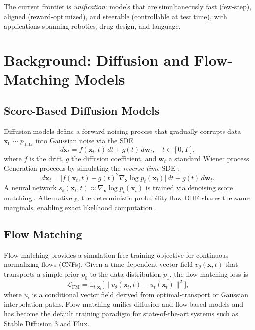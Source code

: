\documentclass[11pt]{article}
\begin{document}
The current frontier is \emph{unification}: models that are simultaneously fast (few-step), aligned (reward-optimized), and steerable (controllable at test time), with applications spanning robotics, drug design, and language.

\section{Background: Diffusion and Flow-Matching Models}
\label{sec:background}

\subsection{Score-Based Diffusion Models}

Diffusion models define a forward noising process that gradually corrupts data $\mathbf{x}_0 \sim p_{\mathrm{data}}$ into Gaussian noise via the SDE
\begin{equation}
    d\mathbf{x}_t = f(\mathbf{x}_t, t)\,dt + g(t)\,d\mathbf{w}_t, \quad t \in [0, T],
\end{equation}
where $f$ is the drift, $g$ the diffusion coefficient, and $\mathbf{w}_t$ a standard Wiener process.
Generation proceeds by simulating the \emph{reverse-time} SDE \citep{anderson1982reverse}:
\begin{equation}
    d\mathbf{x}_t = \bigl[f(\mathbf{x}_t, t) - g(t)^2 \nabla_{\mathbf{x}} \log p_t(\mathbf{x}_t)\bigr]\,dt + g(t)\,d\bar{\mathbf{w}}_t.
\end{equation}
A neural network $s_\theta(\mathbf{x}_t, t) \approx \nabla_{\mathbf{x}} \log p_t(\mathbf{x}_t)$ is trained via denoising score matching \citep{vincent2011connection,song2021scorebased}.
Alternatively, the deterministic probability flow ODE shares the same marginals, enabling exact likelihood computation \citep{song2021sde}.

\subsection{Flow Matching}

Flow matching \citep{lipman2023flow,liu2023flow,albergo2023building} provides a simulation-free training objective for continuous normalizing flows (CNFs).
Given a time-dependent vector field $v_\theta(\mathbf{x}, t)$ that transports a simple prior $p_0$ to the data distribution $p_1$, the flow-matching loss is
\begin{equation}
    \mathcal{L}_{\mathrm{FM}} = \mathbb{E}_{t, \mathbf{x}_t}\bigl[\| v_\theta(\mathbf{x}_t, t) - u_t(\mathbf{x}_t) \|^2\bigr],
\end{equation}
where $u_t$ is a conditional vector field derived from optimal-transport or Gaussian interpolation paths.
Flow matching unifies diffusion and flow-based models and has become the default training paradigm for state-of-the-art systems such as Stable Diffusion 3 and Flux.
\end{document}
